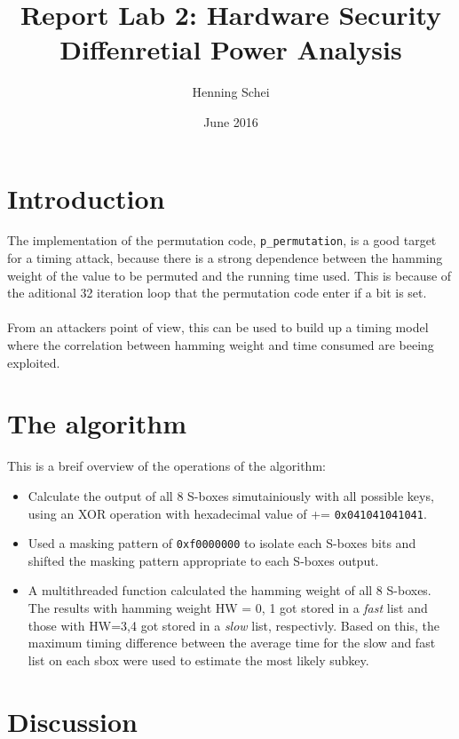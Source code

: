 \documentclass{article}
\title{Report Lab 2: Hardware Security \\ Diffenretial Power Analysis}
\author{Henning Schei}
\date{June 2016}
\begin{document}
\maketitle

\section{Introduction}
The implementation of the permutation code, \texttt{p\_permutation}, is a good target for a timing attack, because there is a strong dependence between the hamming weight of the value to be permuted and the running time used. This is because of the aditional 32 iteration loop that the permutation code enter if a bit is set. \\ \\ From an attackers point of view, this can be used to build up a timing model where the correlation between hamming weight and time consumed are beeing exploited.

\section{The algorithm}


This is a breif overview of the operations of the algorithm:
\begin{itemize}
\item Calculate the output of all 8 S-boxes simutainiously with all possible keys, using an XOR operation with hexadecimal value of += \texttt{0x041041041041}.
\item  Used a masking pattern of \texttt{0xf0000000} to isolate each S-boxes bits and shifted the masking pattern appropriate to each S-boxes output.
\item A multithreaded function calculated the hamming weight of all 8 S-boxes. The results with hamming weight HW = 0, 1  got stored in a \emph{fast} list and those with HW=3,4 got stored in a \emph{slow} list, respectivly.  Based on this, the maximum timing difference between the average time for the slow and fast list on each sbox were used to estimate the most likely subkey.
\end{itemize}


\section{Discussion}
\end{document}
